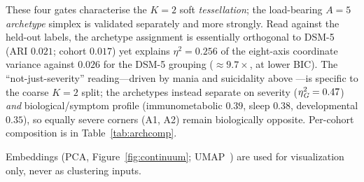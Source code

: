 These four gates characterise the $K=2$ soft \emph{tessellation}; the load-bearing $A=5$
\emph{archetype} simplex is validated separately and more strongly. Read against the held-out
labels, the archetype assignment is essentially orthogonal to DSM-5 (ARI $0.021$; cohort
$0.017$) yet explains $\eta^2=0.256$ of the eight-axis coordinate variance against $0.026$ for
the DSM-5 grouping ($\approx9.7\times$, at lower BIC). The ``not-just-severity'' reading---driven
by mania and suicidality above \Gfac{}---is specific to the coarse $K=2$ split; the archetypes
instead separate on severity ($\eta^2_{\textit{G}}=0.47$) \emph{and} biological/symptom profile
(immunometabolic $0.39$, sleep $0.38$, developmental $0.35$), so equally severe corners (A1, A2)
remain biologically opposite. Per-cohort composition is in Table~\ref{tab:archcomp}.

Embeddings (PCA,
Figure~\ref{fig:continuum}; UMAP~\citep{mcinnes2018umap}) are used for visualization
only, never as clustering inputs.
